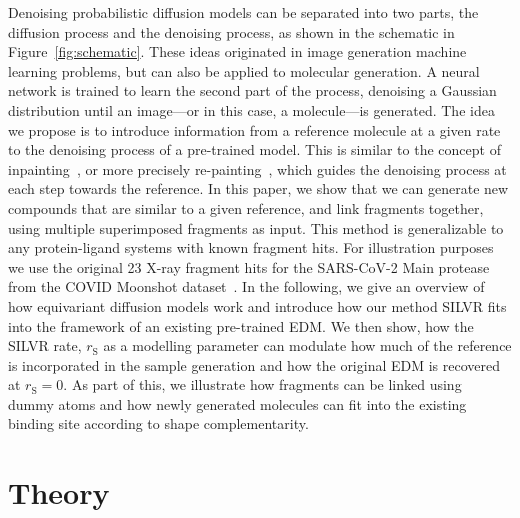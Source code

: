 \documentclass[journal=jacsat,manuscript=article]{achemso}
\begin{document}
Denoising probabilistic diffusion models can be separated into two parts, the diffusion process and the denoising process, as shown in the schematic in Figure~\ref{fig:schematic}. These ideas originated in image generation machine learning problems, but can also be applied to molecular generation. A neural network is trained to learn the second part of the process, denoising a Gaussian distribution until an image---or in this case, a molecule---is generated. The idea we propose is to introduce information from a reference molecule at a given rate to the denoising process of a pre-trained model. This is similar to the concept of inpainting~\cite{qin2021image, xie2012image, squires2023artefact}, or more precisely re-painting~\cite{lugmayr2022repaint}, which guides the denoising process at each step towards the reference. In this paper, we show that we can generate new compounds that are similar to a given reference, and link fragments together, using multiple superimposed fragments as input. This method is generalizable to any protein-ligand systems with known fragment hits. For illustration purposes we use the original 23 X-ray fragment hits for the  SARS-CoV-2 Main protease from the COVID Moonshot dataset~\cite{consortium2023open}. In the following, we give an overview of how equivariant diffusion models work and introduce how our method SILVR fits into the framework of an existing pre-trained EDM. We then show, how the SILVR rate, $r_{\mathrm{S}}$ as a modelling parameter can modulate how much of the reference is incorporated in the sample generation and how the original EDM is recovered at  $r_{\mathrm{S}}=0$. As part of this, we illustrate how fragments can be linked using dummy atoms and how newly generated molecules can fit into the existing binding site according to shape complementarity.

\section{Theory}
\label{sec:theory}
\end{document}
